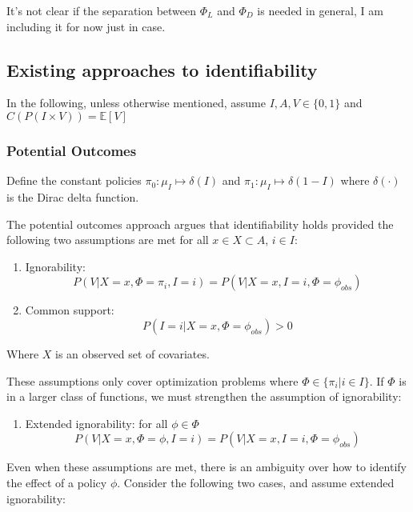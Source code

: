 \begin{remark}
It's not clear if the separation between $\Phi_L$ and $\Phi_D$ is needed in general, I am including it for now just in case.
\end{remark}

\subsection{Existing approaches to identifiability}

In the following, unless otherwise mentioned, assume $I,A,V\in \{0,1\}$ and $C(P(I\times V)) = \mathbb{E}[V]$

\subsubsection{Potential Outcomes}

Define the constant policies $\pi_0:\mu_I\mapsto \delta(I)$ and $\pi_1:\mu_I\mapsto \delta(1-I)$ where $\delta(\cdot)$ is the Dirac delta function.

The potential outcomes approach argues that identifiability holds provided the following two assumptions are met for all $x\in X\subset A$, $i\in I$: \cite{rubin_causal_2005} \cite{sontag_causal_nodate}
\begin{enumerate}
    \item Ignorability: \[P(V|X=x,\Phi=\pi_i, I=i) = P(V|X=x,I=i,\Phi=\phi_{obs})\]
    \item Common support: \[P(I=i|X=x,\Phi=\phi_{obs})>0\]
\end{enumerate}
Where $X$ is an observed set of covariates.

These assumptions only cover optimization problems where $\Phi\in \{\pi_i|i\in I\}$. If $\Phi$ is in a larger class of functions, we must strengthen the assumption of ignorability:

\begin{enumerate}
    \item Extended ignorability: for all $\phi\in\Phi$ \[P(V|X=x,\Phi=\phi, I=i) = P(V|X=x,I=i,\Phi=\phi_{obs})\]
\end{enumerate}

Even when these assumptions are met, there is an ambiguity over how to identify the effect of a policy $\phi$. Consider the following two cases, and assume extended ignorability:

\begin{center}
\end{center}


